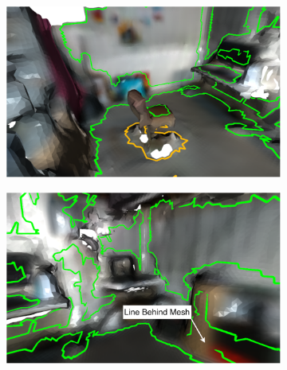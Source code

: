 \begin{figure}[H]
  \begin{subfigure}[t]{.45\linewidth}
    \centering\includegraphics[clip,trim=0cm 0cm 0cm 0cm,width=.99\linewidth]{chapter_3_polylidar3d/imgs/meshes/mesh_polylidar3d_examples-mesh_basement_one.pdf}
    \caption{\label{fig:ch3_mesh_example_a}}
  \end{subfigure}
  \hfill
  \begin{subfigure}[t]{.45\linewidth}
    \centering\includegraphics[clip,trim=0cm 0cm 0cm 0cm,width=.99\linewidth]{chapter_3_polylidar3d/imgs/meshes/mesh_polylidar3d_examples-mesh_basement_two.pdf}
    \caption{\label{fig:ch3_mesh_example_b}}
  \end{subfigure}
  \par\bigskip
  \begin{subfigure}[t]{.45\linewidth}

\end{subfigure}
\end{figure}
